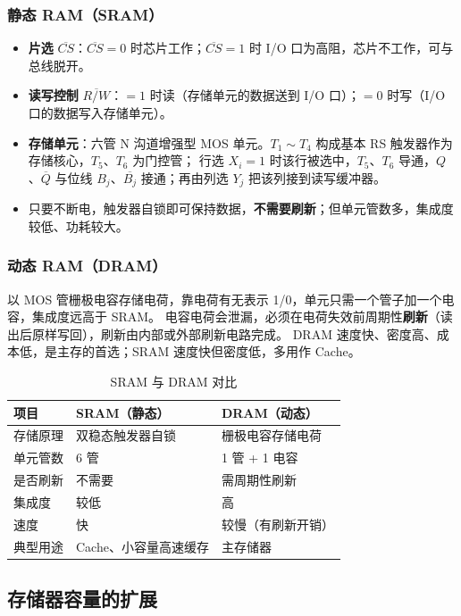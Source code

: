 \subsubsection{静态 RAM（SRAM）}
\begin{itemize}
    \item \textbf{片选} $\overline{CS}$：$\overline{CS}=0$ 时芯片工作；$\overline{CS}=1$ 时 I/O 口为高阻，芯片不工作，可与总线脱开。
    \item \textbf{读写控制} $\overline{R/W}$：$=1$ 时读（存储单元的数据送到 I/O 口）；$=0$ 时写（I/O 口的数据写入存储单元）。
    \item \textbf{存储单元}：六管 N 沟道增强型 MOS 单元。$T_1\sim T_4$ 构成基本 RS 触发器作为存储核心，$T_5$、$T_6$ 为门控管；
    行选 $X_i=1$ 时该行被选中，$T_5$、$T_6$ 导通，$Q$、$\overline{Q}$ 与位线 $B_j$、$\overline{B_j}$ 接通；再由列选 $Y_j$ 把该列接到读写缓冲器。
    \item 只要不断电，触发器自锁即可保持数据，\textbf{不需要刷新}；但单元管数多，集成度较低、功耗较大。
\end{itemize}

\subsubsection{动态 RAM（DRAM）}
以 MOS 管栅极电容存储电荷，靠电荷有无表示 1/0，单元只需一个管子加一个电容，集成度远高于 SRAM。
电容电荷会泄漏，必须在电荷失效前周期性\textbf{刷新}（读出后原样写回），刷新由内部或外部刷新电路完成。
DRAM 速度快、密度高、成本低，是主存的首选；SRAM 速度快但密度低，多用作 Cache。

\begin{table}[!htbp]
\centering
\caption{SRAM 与 DRAM 对比}
\begin{tabular}{lll}
\toprule
项目 & SRAM（静态） & DRAM（动态） \\
\midrule
存储原理 & 双稳态触发器自锁 & 栅极电容存储电荷 \\
单元管数 & 6 管 & 1 管 + 1 电容 \\
是否刷新 & 不需要 & 需周期性刷新 \\
集成度 & 较低 & 高 \\
速度 & 快 & 较慢（有刷新开销） \\
典型用途 & Cache、小容量高速缓存 & 主存储器 \\
\bottomrule
\end{tabular}
\end{table}

\subsection{存储器容量的扩展}
